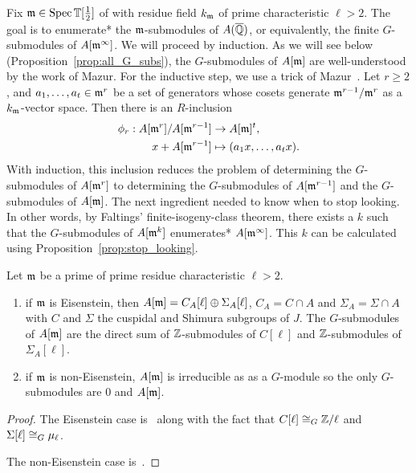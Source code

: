 \documentclass{article}
\begin{document}
Fix $\mathfrak{m}\in \operatorname{Spec} \mathbb{T}[\frac{1}{2}]$ of with residue field $k_{\mathfrak{m}}$ of prime
characteristic $\ell>2$. The goal is to enumerate* the $\mathfrak{m}$-submodules of
$A(\overline{\mathbb{Q}})$, or equivalently, the finite $G$-submodules of $A[\mathfrak{m}^\infty]$. We
will proceed by induction. As we will see below
(Proposition~\ref{prop:all_G_subs}), the $G$-submodules of $A[\mathfrak{m}]$ are
well-understood by the work of Mazur.
For the inductive step, we use a trick of Mazur~\cite[pg.
112]{mazur:eisenstein}. Let $r\geq 2$, and
$a_1,\ldots,a_t\in \mathfrak{m}^r$ be a set of generators whose cosets generate
$\mathfrak{m}^{r-1}/\mathfrak{m}^r$ as a $k_{\mathfrak{m}}$-vector space. Then there is an $R$-inclusion
\begin{align*}
    \phi_r: A[\mathfrak{m}^r]/A[\mathfrak{m}^{r-1}] & \to A[\mathfrak{m}]^t, \\
    x+A[\mathfrak{m}^{r-1}] & \mapsto (a_1x,\ldots,a_tx).
\end{align*}
With induction, this inclusion reduces the problem of determining the
$G$-submodules of $A[\mathfrak{m}^r]$ to determining the $G$-submodules of $A[\mathfrak{m}^{r-1}]$
and the $G$-submodules of $A[\mathfrak{m}]$. The next ingredient needed to know when to
stop looking. In other words, by Faltings' finite-isogeny-class theorem, there
exists a $k$ such that the $G$-submodules of $A[\mathfrak{m}^k]$ enumerates*
$A[\mathfrak{m}^\infty]$. This $k$ can be calculated using
Proposition~\ref{prop:stop_looking}.

\begin{proposition}[Mazur]\label{prop:all_G_subs}
    Let $\mathfrak{m}$ be a prime of prime residue characteristic $\ell>2$.
    \begin{enumerate}
        \item 
            if $\mathfrak{m}$ is Eisenstein, then $A[\mathfrak{m}]=C_A[\ell]\oplus \Sigma_A[\ell]$,
            $C_A=C\cap A$ and $\Sigma_A=\Sigma \cap A$ with $C$ and $\Sigma$
            the cuspidal and Shimura subgroups of $J$. The $G$-submodules of
            $A[\mathfrak{m}]$ are the direct sum of $\mathbb{Z}$-submodules of $C[\ell]$ and
            $\mathbb{Z}$-submodules of $\Sigma_A[\ell]$.
        \item
            if $\mathfrak{m}$ is non-Eisenstein, $A[\mathfrak{m}]$ is irreducible as as a
            $G$-module so the only $G$-submodules are $0$ and $A[\mathfrak{m}]$.
    \end{enumerate}
\end{proposition}
\begin{proof}
    The Eisenstein case is~\cite[Corollary 16.3]{mazur:eisenstein} along with
    the fact that $C[\ell]\cong_G \mathbb{Z}/\ell$ and $\Sigma[\ell]\cong_G \mu_\ell$.

    The non-Eisenstein case is~\cite[Propositon 14.2]{mazur:eisenstein}.
\end{proof}
\end{document}
